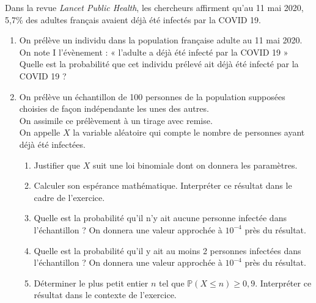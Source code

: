 \documentclass[11pt,fleqn, openany]{book} %
\begin{document}
\begin{exercise}[subtitle={(Asie 2024)}]
Dans la revue \textit{Lancet Public Health}, les chercheurs affirment qu’au 11 mai 2020, 5,7\% des adultes français avaient déjà été infectés par la COVID 19.

\begin{enumerate}
\item On prélève un individu dans la population française adulte au 11 mai 2020.\\
On note I l'évènement : « l'adulte a déjà été infecté par la COVID 19 »\\
Quelle est la probabilité que cet individu prélevé ait déjà été infecté par la COVID 19 ?
\item On prélève un échantillon de 100 personnes de la population supposées choisies de façon indépendante les unes des autres.\\ On assimile ce prélèvement à un tirage avec remise. \\On appelle $X$ la variable aléatoire qui compte le nombre de personnes ayant déjà été infectées.
\begin{enumerate}
\item Justifier que $X$ suit une loi binomiale dont on donnera les paramètres.
\item Calculer son espérance mathématique. Interpréter ce résultat dans le cadre
de l'exercice.
\item Quelle est la probabilité qu'il n'y ait aucune personne infectée dans l'échantillon ?
On donnera une valeur approchée à $10^{-4}$ près du résultat.
\item Quelle est la probabilité qu'il y ait au moins 2 personnes infectées dans l'échantillon ?
On donnera une valeur approchée à $10^{-4}$ près du résultat.
\item Déterminer le plus petit entier $n$ tel que $\mathbb{P}(X \leqslant n) \geqslant 0,9$.
Interpréter ce résultat dans le contexte de l'exercice.\end{enumerate}
\end{enumerate}
\end{exercise}
\end{document}
